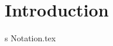 \documentclass[../open-optimization/open-optimization.tex]{subfiles}
\begin{document}

\chapter*{Introduction}s
{Notation.tex}


\end{document}
